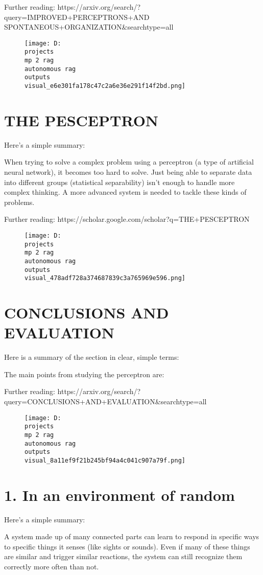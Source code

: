 \documentclass[12pt,a4paper]{article}
\begin{document}
Further reading: https://arxiv.org/search/?query=IMPROVED+PERCEPTRONS+AND
SPONTANEOUS+ORGANIZATION&searchtype=all
\begin{figure}[h]
\centering
\texttt{[image: D:\\projects\\mp 2 rag\\autonomous rag\\outputs\\visual\_e6e301fa178c47c2a6e36e291f14f2bd.png]}
\end{figure}
\section{THE PESCEPTRON}
Here's a simple summary:

When trying to solve a complex problem using a perceptron (a type of artificial neural network), it becomes too hard to solve. Just being able to separate data into different groups (statistical separability) isn't enough to handle more complex thinking. A more advanced system is needed to tackle these kinds of problems.

Further reading: https://scholar.google.com/scholar?q=THE+PESCEPTRON
\begin{figure}[h]
\centering
\texttt{[image: D:\\projects\\mp 2 rag\\autonomous rag\\outputs\\visual\_478adf728a374687839c3a765969e596.png]}
\end{figure}
\section{CONCLUSIONS AND EVALUATION}
Here is a summary of the section in clear, simple terms:

The main points from studying the perceptron are:

Further reading: https://arxiv.org/search/?query=CONCLUSIONS+AND+EVALUATION&searchtype=all
\begin{figure}[h]
\centering
\texttt{[image: D:\\projects\\mp 2 rag\\autonomous rag\\outputs\\visual\_8a11ef9f21b245bf94a4c041c907a79f.png]}
\end{figure}
\section{1. In an environment of random}
Here's a simple summary:

A system made up of many connected parts can learn to respond in specific ways to specific things it senses (like sights or sounds). Even if many of these things are similar and trigger similar reactions, the system can still recognize them correctly more often than not.
\end{document}
